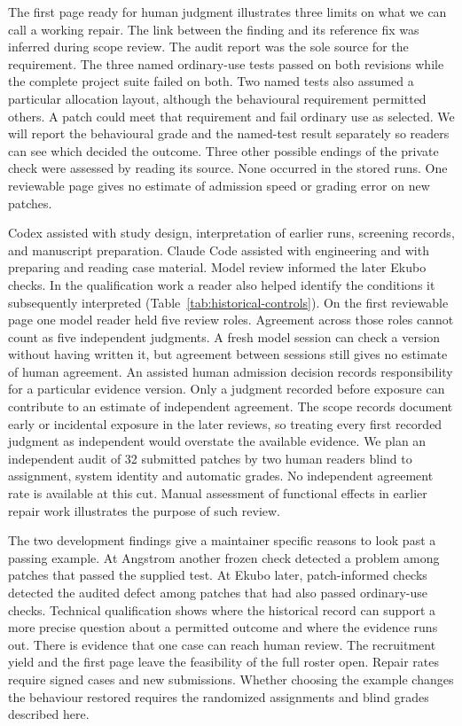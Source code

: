 The first page ready for human judgment illustrates three limits on what we can call a working repair. The link between the finding and its reference fix was inferred during scope review. The audit report was the sole source for the requirement. The three named ordinary-use tests passed on both revisions while the complete project suite failed on both. Two named tests also assumed a particular allocation layout, although the behavioural requirement permitted others. A patch could meet that requirement and fail ordinary use as selected. We will report the behavioural grade and the named-test result separately so readers can see which decided the outcome. Three other possible endings of the private check were assessed by reading its source. None occurred in the stored runs. One reviewable page gives no estimate of admission speed or grading error on new patches.

Codex assisted with study design, interpretation of earlier runs, screening records, and manuscript preparation. Claude Code assisted with engineering and with preparing and reading case material. Model review informed the later Ekubo checks. In the qualification work a reader also helped identify the conditions it subsequently interpreted (Table~\ref{tab:historical-controls}). On the first reviewable page one model reader held five review roles. Agreement across those roles cannot count as five independent judgments. A fresh model session can check a version without having written it, but agreement between sessions still gives no estimate of human agreement. An assisted human admission decision records responsibility for a particular evidence version. Only a judgment recorded before exposure can contribute to an estimate of independent agreement. The scope records document early or incidental exposure in the later reviews, so treating every first recorded judgment as independent would overstate the available evidence. We plan an independent audit of 32 submitted patches by two human readers blind to assignment, system identity and automatic grades. No independent agreement rate is available at this cut. Manual assessment of functional effects in earlier repair work illustrates the purpose of such review.~\cite{bui2024apr4vul,bobadilla2026fixes}

The two development findings give a maintainer specific reasons to look past a passing example. At Angstrom another frozen check detected a problem among patches that passed the supplied test. At Ekubo later, patch-informed checks detected the audited defect among patches that had also passed ordinary-use checks. Technical qualification shows where the historical record can support a more precise question about a permitted outcome and where the evidence runs out. There is evidence that one case can reach human review. The recruitment yield and the first page leave the feasibility of the full roster open. Repair rates require signed cases and new submissions. Whether choosing the example changes the behaviour restored requires the randomized assignments and blind grades described here.
